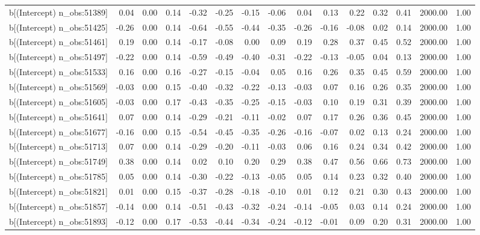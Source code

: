 \begin{table}[ht]
\begin{tabular}{rrrrrrrrrrrrrrr}
  b[(Intercept) n\_obs:51389] & 0.04 & 0.00 & 0.14 & -0.32 & -0.25 & -0.15 & -0.06 & 0.04 & 0.13 & 0.22 & 0.32 & 0.41 & 2000.00 & 1.00 \\ 
  b[(Intercept) n\_obs:51425] & -0.26 & 0.00 & 0.14 & -0.64 & -0.55 & -0.44 & -0.35 & -0.26 & -0.16 & -0.08 & 0.02 & 0.14 & 2000.00 & 1.00 \\ 
  b[(Intercept) n\_obs:51461] & 0.19 & 0.00 & 0.14 & -0.17 & -0.08 & 0.00 & 0.09 & 0.19 & 0.28 & 0.37 & 0.45 & 0.52 & 2000.00 & 1.00 \\ 
  b[(Intercept) n\_obs:51497] & -0.22 & 0.00 & 0.14 & -0.59 & -0.49 & -0.40 & -0.31 & -0.22 & -0.13 & -0.05 & 0.04 & 0.13 & 2000.00 & 1.00 \\ 
  b[(Intercept) n\_obs:51533] & 0.16 & 0.00 & 0.16 & -0.27 & -0.15 & -0.04 & 0.05 & 0.16 & 0.26 & 0.35 & 0.45 & 0.59 & 2000.00 & 1.00 \\ 
  b[(Intercept) n\_obs:51569] & -0.03 & 0.00 & 0.15 & -0.40 & -0.32 & -0.22 & -0.13 & -0.03 & 0.07 & 0.16 & 0.26 & 0.35 & 2000.00 & 1.00 \\ 
  b[(Intercept) n\_obs:51605] & -0.03 & 0.00 & 0.17 & -0.43 & -0.35 & -0.25 & -0.15 & -0.03 & 0.10 & 0.19 & 0.31 & 0.39 & 2000.00 & 1.00 \\ 
  b[(Intercept) n\_obs:51641] & 0.07 & 0.00 & 0.14 & -0.29 & -0.21 & -0.11 & -0.02 & 0.07 & 0.17 & 0.26 & 0.36 & 0.45 & 2000.00 & 1.00 \\ 
  b[(Intercept) n\_obs:51677] & -0.16 & 0.00 & 0.15 & -0.54 & -0.45 & -0.35 & -0.26 & -0.16 & -0.07 & 0.02 & 0.13 & 0.24 & 2000.00 & 1.00 \\ 
  b[(Intercept) n\_obs:51713] & 0.07 & 0.00 & 0.14 & -0.29 & -0.20 & -0.11 & -0.03 & 0.06 & 0.16 & 0.24 & 0.34 & 0.42 & 2000.00 & 1.00 \\ 
  b[(Intercept) n\_obs:51749] & 0.38 & 0.00 & 0.14 & 0.02 & 0.10 & 0.20 & 0.29 & 0.38 & 0.47 & 0.56 & 0.66 & 0.73 & 2000.00 & 1.00 \\ 
  b[(Intercept) n\_obs:51785] & 0.05 & 0.00 & 0.14 & -0.30 & -0.22 & -0.13 & -0.05 & 0.05 & 0.14 & 0.23 & 0.32 & 0.40 & 2000.00 & 1.00 \\ 
  b[(Intercept) n\_obs:51821] & 0.01 & 0.00 & 0.15 & -0.37 & -0.28 & -0.18 & -0.10 & 0.01 & 0.12 & 0.21 & 0.30 & 0.43 & 2000.00 & 1.00 \\ 
  b[(Intercept) n\_obs:51857] & -0.14 & 0.00 & 0.14 & -0.51 & -0.43 & -0.32 & -0.24 & -0.14 & -0.05 & 0.03 & 0.14 & 0.24 & 2000.00 & 1.00 \\ 
  b[(Intercept) n\_obs:51893] & -0.12 & 0.00 & 0.17 & -0.53 & -0.44 & -0.34 & -0.24 & -0.12 & -0.01 & 0.09 & 0.20 & 0.31 & 2000.00 & 1.00 \\ 

\end{tabular}
\end{table}
